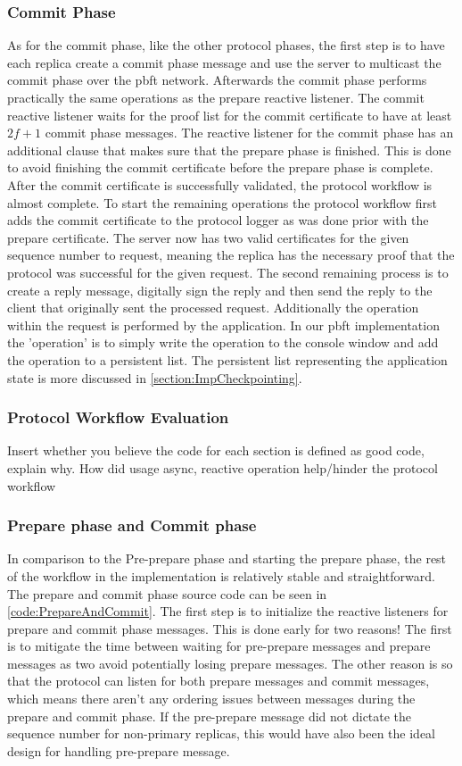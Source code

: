 \subsubsection{Commit Phase}
As for the commit phase, like the other protocol phases, the first step is to have each replica create a commit phase message and use the server to multicast the commit phase over the \ac{pbft} network. Afterwards the commit phase performs practically the same operations as the prepare reactive listener. The commit reactive listener waits for the proof list for the commit certificate to have at least $2f+1$ commit phase messages. The reactive listener for the commit phase has an additional  clause that makes sure that the prepare phase is finished. This is done to avoid finishing the commit certificate before the prepare phase is complete.  After the commit certificate is successfully validated, the protocol workflow is almost complete. To start the remaining operations the protocol workflow first adds the commit certificate to the protocol logger as was done prior with the prepare certificate. The server now has two valid certificates for the given sequence number to request, meaning the replica has the necessary proof that the protocol was successful for the given request. The second remaining process is to create a reply message, digitally sign the reply and then send the reply to the client that originally sent the processed request. Additionally the operation within the request is performed by the application. In our \ac{pbft} implementation the 'operation' is to simply write the operation to the console window and add the operation to a persistent list. The persistent list representing the application state is more discussed in \autoref{section:ImpCheckpointing}.

\subsubsection{Protocol Workflow Evaluation}
Insert whether you believe the code for each section is defined as good code, explain why. How did usage async, reactive operation help/hinder the protocol workflow

\iffalse
\subsubsection{Prepare phase and Commit phase}
In comparison to the Pre-prepare phase and starting the prepare phase, the rest of the workflow in the implementation is relatively stable and straightforward. The prepare and commit phase source code can be seen in \autoref{code:PrepareAndCommit}. The first step is to initialize the reactive listeners for prepare and commit phase messages. This is done early for two reasons! The first is to mitigate the time between waiting for pre-prepare messages and prepare messages as two avoid potentially losing prepare messages. The other reason is so that the protocol can listen for both prepare messages and commit messages, which means there aren't any ordering issues between messages during the prepare and commit phase. If the pre-prepare message did not dictate the sequence number for non-primary replicas, this would have also been the ideal design for handling pre-prepare message. 

